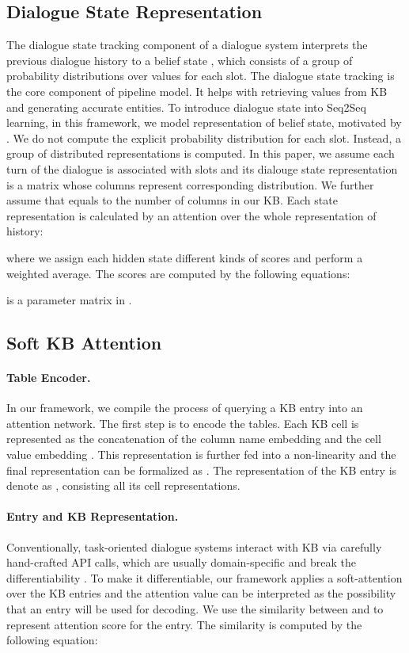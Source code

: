\documentclass[11pt]{article}
\begin{document}
\subsection{Dialogue State Representation}
The dialogue state tracking component of a dialogue system interprets the previous dialogue history to 
a belief state \cite{williams:2013:SIGDial}, which consists of a group of probability distributions over 
values for each slot. The dialogue state tracking is the core component of pipeline model. It helps with retrieving values from KB and generating accurate entities. To introduce dialogue state into Seq2Seq learning, in this framework, we model representation of belief state, motivated by 
. We do not compute the explicit probability distribution for each 
slot. Instead, a group of distributed representations is computed. 
In this paper, we assume each turn of the dialogue is associated with  slots and its dialouge state representation
is a matrix  whose columns represent corresponding distribution.
We further assume that  equals to the number of columns in our KB.
Each state representation  is calculated 
by an attention over the whole representation of history:

where we assign each hidden state  different kinds of scores and perform a weighted average. The 
scores are computed by the following equations:

 is a 
parameter matrix in .

\subsection{Soft KB Attention}
\paragraph{Table Encoder.}
In our framework, we compile the process of querying  a KB entry into an attention network. The first step is to encode the tables.
Each KB cell is represented as the concatenation of the column name embedding  and the cell value embedding .
This representation is further fed into a  non-linearity and the final representation can be formalized as .
The representation of the KB entry  is denote as , consisting all its cell representations.


\paragraph{Entry and KB Representation.}
\label{KB}
Conventionally, task-oriented dialogue systems interact with KB via carefully hand-crafted API calls, which are usually domain-specific and break the differentiability \cite{wen:2017:EACL}. To make it differentiable, our framework applies a soft-attention over the KB entries and the attention value can be interpreted as the possibility that an entry will be used for decoding. 
	We use the similarity between  and  to represent attention score for the  entry. 
	The similarity is computed by the following equation:
\end{document}
